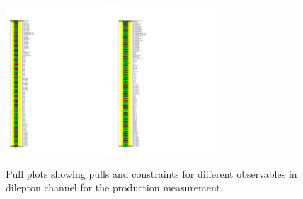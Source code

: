 \begin{figure}[ht]
  \centering
  \includegraphics[width=0.35\textwidth]{figures/diff_xsec/dilep_tty_prod_mu_blinded/compare_NP_pulls/compare_NP_dilep_fits_pt_ptj1_ptll/NuisPar_comp.pdf}%
  \includegraphics[width=0.35\textwidth]{figures/diff_xsec/dilep_tty_prod_mu_blinded/compare_NP_pulls/compare_NP_dilep_fits_dr_dr1_dr2/NuisPar_comp.pdf}%
  \caption{Pull plots showing pulls and constraints for different observables in dilepton channel for the \tty production measurement.}
  \label{fig:pull_plot_pt_tty_dec_free_dilep_mu_blinded_1}
\end{figure}
\FloatBarrier

